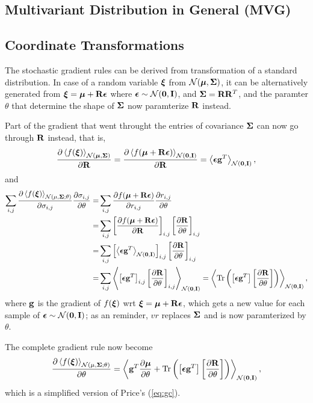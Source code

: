 \documentclass[11pt]{article} \usepackage{textcomp,bbding,subfig}
\begin{document}
\subsection{Multivariant Distribution in General (MVG)}

\subsection{Coordinate Transformations}
The stochastic gradient rules can be derived from transformation of a
standard distribution. In case of a random variable $\bs{\xi}$ from
$\mvns{\mu}{\Sigma}$, it can be alternatively generated from
$\bs{\xi} = \bs{\mu} + \xr\bs{\epsilon}$ where
$\bs{\epsilon} \sim \mvni$, and $\bs{\Sigma} = \xr\xr^T$, and the
paramter $\theta$ that determine the shape of $\bs{\Sigma}$ now
paramterize $\xr$ instead.

Part of the gradient that went throught the entries of covariance
$\bs{\Sigma}$ can now go through $\xr$ instead, that is,
\begin{align}\label{eq:gr} %
  \PDV{\funs}{\xr} =
  \PDV{\mean{f(\bs{\mu} + \xr \bs{\epsilon})}{\mvni}}{\xr} =
  \mean{\bs{\epsilon}\vg^T}{\mvni},
\end{align}
and
\begin{align*}
  \sum_{i,j} \PDV{\mean{f(\bs{\xi})}{\dstp}}{\sigma_{i,j}} \PDV{\sigma_{i,j}}{\theta}
  = & \sum_{i,j}       \PDV{f(\bs{\mu} + \xr\bs{\epsilon})}{r_{i,j}}                \PDV{r_{i,j}}{\theta} \\
  = & \sum_{i,j} \left[\PDV{f(\bs{\mu} + \xr\bs{\epsilon})}{\xr}\right]_{i,j} \left[\PDV{\xr}{\theta}\right]_{i,j} \\
  = & \sum_{i,j} \left[\mean{\bs{\epsilon}\vg^T}{\mvni}         \right]_{i,j} \left[\PDV{\xr}{\theta}\right]_{i,j} \\
  = & \sum_{i,j} \mean{\left[\bs{\epsilon}\vg^T\right]_{i,j} \left[\PDV{\xr}{\theta}\right]_{i,j}}{\mvni} =
      \mean{\trb{\left[\bs{\epsilon}\vg^T\right]\left[\PDV{\xr}{\theta}\right]}}{\mvni},
\end{align*}
where $\vg$ is the gradient of $f(\bs{\xi})$ wrt
$\bs{\xi} = \bs{\mu} + \xr\bs{\epsilon}$, which gets a new value for
each sample of $\bs{\epsilon} \sim \mvni$; as an reminder, $vr$
replaces $\bs{\Sigma}$ and is now paramterized by $\theta$.

The complete gradient rule now become
\begin{align}
  \PDV{\mean{f(\bs{\xi})}{\dstp}}{\theta} =
  \mean{
  \vg^T \PDV{\bs{\mu}}{\theta} + 
  \trb{\left[\bs{\epsilon}\vg^T\right]\left[\PDV{\xr}{\theta}\right]}
  } {\mvni},
\end{align}
which is a simplified version of Price's (\ref{eq:gc}).
\end{document}
